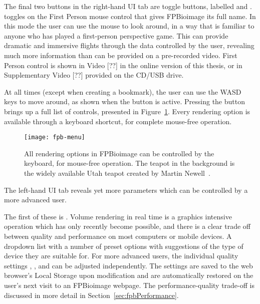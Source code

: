 The final two buttons in the right-hand UI tab are toggle buttons, labelled  and .
 toggles on the First Person mouse control that gives FPBioimage its full name.
In this mode the user can use the mouse to look around, in a way that is familiar to anyone who has played a first-person perspective game.
This can provide dramatic and immersive flights through the data controlled by the user, revealing much more information than can be provided on a pre-recorded video.
First Person control is shown in Video [??] in the online version of this thesis, or in Supplementary Video [??] provided on the CD/USB drive.

At all times (except when creating a bookmark), the user can use the WASD keys to move around, as shown when the  button is active.
Pressing the  button brings up a full list of controls, presented in Figure~\ref{fig:fpbMenu}.
Every rendering option is available through a keyboard shortcut, for complete mouse-free operation.

\begin{figure}[tbp!]
\centering
\texttt{[image: fpb-menu]}
\caption[FPBioimage: Keyboard controls allow FPBioimage to be used without a mouse]{All rendering options in FPBioimage can be controlled by the keyboard, for mouse-free operation. The teapot in the background is the widely available Utah teapot created by Martin Newell~\cite{torrence2006martin}. }
\label{fig:fpbMenu}
\end{figure}

The left-hand UI tab reveals yet more parameters which can be controlled by a more advanced user.

The first of these is .
Volume rendering in real time is a graphics intensive operation which has only recently become possible, and there is a clear trade off between quality and performance on most computers or mobile devices.
A dropdown list with a number of preset options with suggestions of the type of device they are suitable for.
For more advanced users, the individual quality settings , , and  can be adjusted independently.
The  settings are saved to the web browser's Local Storage upon modification and are automatically restored on the user's next visit to an FPBioimage webpage.
The performance-quality trade-off is discussed in more detail in Section~\ref{sec:fpbPerformance}.

